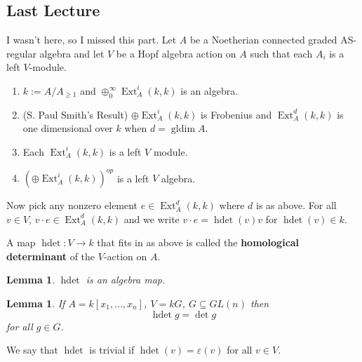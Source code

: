 \documentclass[12pt]{article}
\theoremstyle{break}
\theoremstyle{nonumberbreak}
\theoremstyle{changebreak}
\newtheorem{lem}[thm]{Lemma}
\theoremstyle{break}
\theoremstyle{nonumberbreak}
\theoremstyle{nonumberplain}
\theoremstyle{change}
\DeclareMathOperator{\Ext}{Ext}
\DeclareMathOperator{\gldim}{gldim}
\begin{document}
\subsection{Last Lecture}
I wasn't here, so I missed this part. Let $A$ be a Noetherian connected graded AS-regular algebra and let
$V$ be a Hopf algebra action on $A$ such that each $A_i$ is a left $V$-module.
\begin{enumerate}
	\item $k:=A/A_{\ge 1}$ and $\oplus_0^\infty \Ext_A^i(k,k)$ is an algebra.
	\item (S. Paul Smith's Result) $\oplus \Ext_A^i(k,k)$ is Frobenius and $\Ext_A^d(k,k)$ is one
	dimensional over $k$ when $d=\gldim A$.
	\item  Each $\Ext^i_A(k,k)$ is a left $V$ module.
	\item $(\oplus \Ext_A^i(k,k))^{op}$ is a left $V$ algebra.
\end{enumerate}

Now pick any nonzero element $e\in \Ext_A^d(k,k)$ where $d$ is as above. For all $v\in V$, 
$v\cdot e\in \Ext_A^d(k,k)$ and we write $v\cdot e=\operatorname{hdet}(v)v$ for $\operatorname{hdet}(v)\in k$.
\begin{defn}
	A map $\operatorname{hdet}:V\to k$ that fits in as above is called the \textbf{homological determinant}
	of the $V$-action on $A$.
\end{defn}
\begin{lem}
	$\operatorname{hdet}$ is an algebra map.
\end{lem}
\begin{lem}
	If $A=k[x_1,\dots,x_n]$, $V=kG$, $G\subseteq GL(n)$ then
	\[\operatorname{hdet} g = \det g\]
	for all $g\in G$.
\end{lem}
\begin{defn}
	We say that $\operatorname{hdet}$ is trivial if $\operatorname{hdet}(v)=\varepsilon(v)$ for all $v\in V$.
\end{defn}
\end{document}
